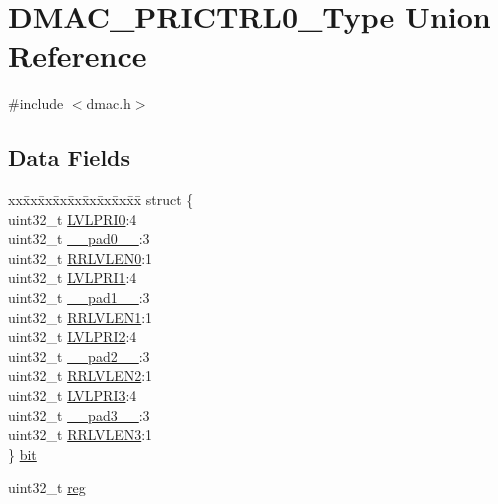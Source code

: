 \hypertarget{union_d_m_a_c___p_r_i_c_t_r_l0___type}{}\section{D\+M\+A\+C\+\_\+\+P\+R\+I\+C\+T\+R\+L0\+\_\+\+Type Union Reference}
\label{union_d_m_a_c___p_r_i_c_t_r_l0___type}


{\ttfamily \#include $<$dmac.\+h$>$}

\subsection*{Data Fields}
\begin{DoxyCompactItemize}
\item 
\begin{tabbing}
xx\=xx\=xx\=xx\=xx\=xx\=xx\=xx\=xx\=\kill
struct \{\\
\>uint32\_t \mbox{\hyperlink{union_d_m_a_c___p_r_i_c_t_r_l0___type_a88fe7fcc7c47a26cef86a8d3462a8696}{LVLPRI0}}:4\\
\>uint32\_t \mbox{\hyperlink{union_d_m_a_c___p_r_i_c_t_r_l0___type_a3e57c2ef1c3ffb36722f000cc1156824}{\_\_pad0\_\_}}:3\\
\>uint32\_t \mbox{\hyperlink{union_d_m_a_c___p_r_i_c_t_r_l0___type_adadf6e465f23bd1954cd992ab7f6cb44}{RRLVLEN0}}:1\\
\>uint32\_t \mbox{\hyperlink{union_d_m_a_c___p_r_i_c_t_r_l0___type_a90a0fd6f525b4faf8acd725dfdab3320}{LVLPRI1}}:4\\
\>uint32\_t \mbox{\hyperlink{union_d_m_a_c___p_r_i_c_t_r_l0___type_a6712ba6dd1d5b43d2d56ff8ac4e275a7}{\_\_pad1\_\_}}:3\\
\>uint32\_t \mbox{\hyperlink{union_d_m_a_c___p_r_i_c_t_r_l0___type_ad43137c4686eaf29ccbf647bf4e7a253}{RRLVLEN1}}:1\\
\>uint32\_t \mbox{\hyperlink{union_d_m_a_c___p_r_i_c_t_r_l0___type_a1b6bebf9dc87c18d905b8d89aa8c3ef2}{LVLPRI2}}:4\\
\>uint32\_t \mbox{\hyperlink{union_d_m_a_c___p_r_i_c_t_r_l0___type_a9ce12a63de64ef64ae2d59d128251cae}{\_\_pad2\_\_}}:3\\
\>uint32\_t \mbox{\hyperlink{union_d_m_a_c___p_r_i_c_t_r_l0___type_ab57c3946fd3981e4d7adb86c8eda2293}{RRLVLEN2}}:1\\
\>uint32\_t \mbox{\hyperlink{union_d_m_a_c___p_r_i_c_t_r_l0___type_a7cd339ac4ad58b9a5046b840093679fd}{LVLPRI3}}:4\\
\>uint32\_t \mbox{\hyperlink{union_d_m_a_c___p_r_i_c_t_r_l0___type_a4854608c0e776f0704a4d9a4b98ea57d}{\_\_pad3\_\_}}:3\\
\>uint32\_t \mbox{\hyperlink{union_d_m_a_c___p_r_i_c_t_r_l0___type_afcf5b5938a12e866c69030cb74dd7e67}{RRLVLEN3}}:1\\
\} \mbox{\hyperlink{union_d_m_a_c___p_r_i_c_t_r_l0___type_a051aa78c4ef2b8a4c90dbfc970588444}{bit}}\\

\end{tabbing}\item 
uint32\+\_\+t \mbox{\hyperlink{union_d_m_a_c___p_r_i_c_t_r_l0___type_a6b91636401516a477989a336376d7b40}{reg}}
\end{DoxyCompactItemize}


